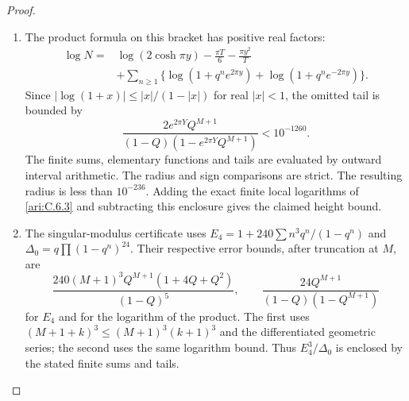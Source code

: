 \begin{proof}
\begin{enumerate}[label=\arabic*.,leftmargin=*]
\item The product formula on this bracket has positive real factors:
\begin{align*}
 \log N={}&\log(2\cosh\pi y)-\frac{\pi T}{6}
                      -\frac{\pi y^2}{T}\\
 &+\sum_{n\ge1}\{\log(1+q^ne^{2\pi y})
                         +\log(1+q^ne^{-2\pi y})\}.
\end{align*}
Since $|\log(1+x)|\le |x|/(1-|x|)$ for real $|x|<1$,
the omitted tail is bounded by
\[
 \frac{2e^{2\pi Y}Q^{M+1}}
 {(1-Q)(1-e^{2\pi Y}Q^{M+1})}<10^{-1260}.
\]
The finite sums, elementary functions and tails are evaluated by
outward interval arithmetic. The radius and sign comparisons are strict. The resulting radius is less than $10^{-236}$.
Adding the exact finite local logarithms of \ref{ari:C.6.3} and
subtracting this enclosure gives the claimed height bound.

\item The singular-modulus certificate uses
$E_4=1+240\sum n^3q^n/(1-q^n)$ and
$\Delta_0=q\prod(1-q^n)^{24}$. Their respective error
bounds, after truncation at $M$, are
\[
 \frac{240(M+1)^3Q^{M+1}(1+4Q+Q^2)}{(1-Q)^5},
 \qquad
 \frac{24Q^{M+1}}{(1-Q)(1-Q^{M+1})}
\]
for $E_4$ and for the logarithm of the product. The first
uses $(M+1+k)^3\le(M+1)^3(k+1)^3$ and the differentiated
geometric series; the second uses the same logarithm bound.
Thus $E_4^3/\Delta_0$ is enclosed by the stated finite sums and tails.
\end{enumerate}
\end{proof}